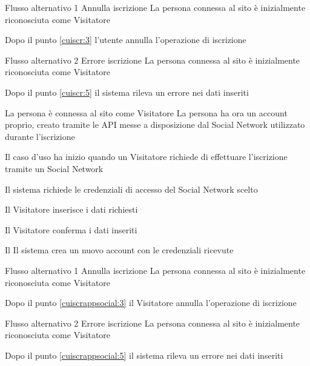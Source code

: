%
{Flusso alternativo 1}%
{Annulla iscrizione}%
{La persona connessa al sito è inizialmente riconosciuta come Visitatore}%
{\postNulle}%
{\begin{enumCU}
		\item Dopo il punto \ref{cuiscr:3} l'utente annulla l'operazione di iscrizione
	\end{enumCU}}%
%
{Flusso alternativo 2}%
{Errore iscrizione}%
{La persona connessa al sito è inizialmente riconosciuta come Visitatore}%
{\postNulle}%
{\begin{enumCU}
		\item Dopo il punto \ref{cuiscr:5} il sistema rileva un errore nei dati inseriti
	\end{enumCU}}%



{}
{La persona è connessa al sito come Visitatore}
{La persona ha ora un account proprio, creato tramite le API messe a disposizione dal Social Network utilizzato durante l'iscrizione}
{\begin{enumCU}
		\item Il caso d'uso ha inizio quando un Visitatore richiede di effettuare l'iscrizione tramite un Social Network
		\item Il sistema richiede le credenziali di accesso del Social Network scelto
		\item Il Visitatore inserisce i dati richiesti \label{cuiscrappsocial:3}
		\item Il Visitatore conferma i dati inseriti \label{cuiscrappsocial:5}
		\item Il Il sistema crea un nuovo account con le credenziali ricevute
	\end{enumCU}}

%
{Flusso alternativo 1}%
{Annulla iscrizione}%
{La persona connessa al sito è inizialmente riconosciuta come Visitatore}%
{\postNulle}%
{\begin{enumCU}
		\item Dopo il punto \ref{cuiscrappsocial:3} il Visitatore annulla l'operazione di iscrizione
	\end{enumCU}}%
%
{Flusso alternativo 2}%
{Errore iscrizione}%
{La persona connessa al sito è inizialmente riconosciuta come Visitatore}%
{\postNulle}%
{\begin{enumCU}
		\item Dopo il punto \ref{cuiscrappsocial:5} il sistema rileva un errore nei dati inseriti
	\end{enumCU}}%

